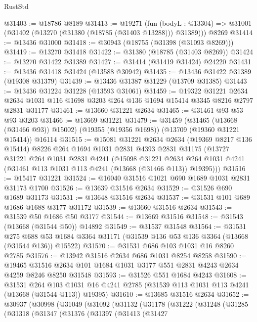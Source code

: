 \begin{lexlean}{RustStd}
\begin{coremodule}
@31403 := @18786 @8189
@31413 := @19271
    (fun (bodyL : @13304) => @31001 (@31402 (@13270 (@31380 (@18785 (@31403 @13288))) @31389)))
    @8269
@31414 := @13436 @31000
@31418 := @30943 (@18755 (@31398 (@31093 @8269)))
@31419 := @13270 @31418
@31422 := @31380 (@18785 (@31403 @8269))
@31424 := @13270 @31422 @31389
@31427 := @31414 (@31419 @31424) @24220
@31431 := @13436 @31418 @31424 (@13588 @30942)
@31435 := @13436 @31422 @31389 (@19308 @31379)
@31439 := @13436 @31387 @31229 (@13709 @31385)
@31443 := @13436 @31224 @31228 (@13593 @31061)
@31459 := @19322
    @31221
    @2634
    @2634
    @1031
    @116
    @1698
    @3203
    @264
    @136
    @1694
    @15414
    @3345
    @8216
    @2797
    @2831
    @31177
@31461 := @13660 @31221 @2634
@31465 := @31461 @93 @53 @93 @3203
@31466 := @13669 @31221
@31479 := @31459
    (@31465 (@13668 (@31466 @93)) @15002)
    (@19355 (@19356 @1698))
    (@13709 (@19360 @31221 @15414))
    @16114
@31515 := @15081
    @31221
    @2634
    @2634
    (@19369 @8217 @136 @15414)
    @8226
    @264
    @1694
    @1031
    @2831
    @4393
    @2831
    @31175
    (@13727
      @31221
      @264
      @1031
      @2831
      @4241
      (@15098
        @31221
        @2634
        @264
        @1031
        @4241
        (@31461 @113 @1031 @113 @4241 (@13668 (@31466 @113)) @19395)))
@31516 := @15417 @31221
@31524 := @16040 @31516 @1021 @690 @1689 @1031 @2831 @31173 @1700
@31526 := @13639 @31516 @2634
@31529 := @31526 @690 @1689 @31173
@31531 := @13648 @31516 @2634
@31537 := @31531 @101 @689 @1686 @1688 @3177 @31172
@31539 := @13660 @31516 @2634
@31543 := @31539 @50 @1686 @50 @3177
@31544 := @13669 @31516
@31548 := @31543 (@13668 (@31544 @50)) @14892
@31549 := @31537 @31548
@31564 := @31531
    @275
    @688
    @53
    @1684
    @3364
    @31171
    (@31539 @136 @53 @136 @3364 (@13668 (@31544 @136)) @15522)
@31570 := @31531 @686 @103 @1031 @16 @8260 @2785
@31576 := @13942 @31516 @2634 @686 @1031 @8254 @8258
@31590 := @19465 @31516 @2634 @101 @1684 @1031 @3177 @551 @2831 @4243 @2634 @4259 @8246 @8250 @31548
@31593 := @31526 @551 @1684 @4243
@31608 := @31531
    @264
    @103
    @1031
    @16
    @4241
    @2785
    (@31539 @113 @1031 @113 @4241 (@13668 (@31544 @113)) @19395)
@31610 := @13685 @31516 @2634
@31652 := @30937
    (@30998
      (@31049
        (@31092
          (@31132
            (@31178
              (@31222
                (@31248
                  (@31285
                    (@31318
                      (@31347
                        (@31376
                          (@31397
                            (@31413
                              (@31427

\end{coremodule}
\end{lexlean}
